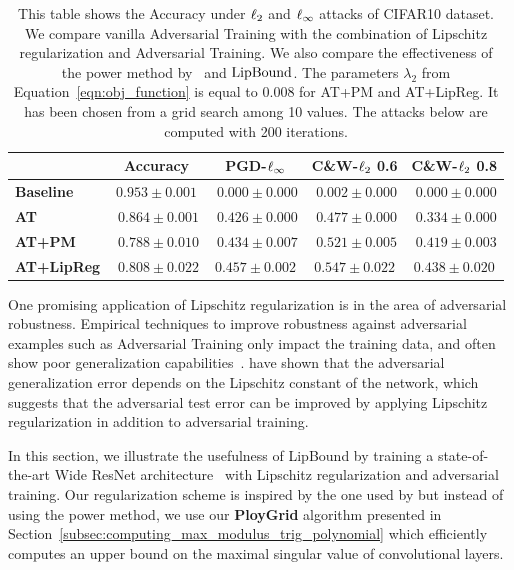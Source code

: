 \begin{table}[t]
  \centering
  \caption{This table shows the Accuracy under $\ell_2$ and $\ell_\infty$ attacks of CIFAR10 dataset. We compare vanilla Adversarial Training with the combination of Lipschitz regularization and Adversarial Training. We also compare the effectiveness of the power method by~\cite{farnia2018generalizable} and $\operatorname{LipBound}$. The parameters $\lambda_2$ from Equation~\ref{eqn:obj_function} is equal to $0.008$ for AT+PM and AT+LipReg. It has been chosen from a grid search among 10 values. The attacks below are computed with 200 iterations. }
    \begin{tabular}{lcccc}
    \toprule
      & \textbf{Accuracy} & \textbf{PGD-$\ell_\infty$} & \textbf{C\&W-$\ell_2$ 0.6} & \textbf{C\&W-$\ell_2$ 0.8} \\
    \midrule
    \textbf{Baseline} & $\mathbf{0.953}\pm0.001$ & $\phantom{.}0.000\pm0.000$ & $\phantom{.}0.002\pm0.000$ & $\phantom{.}0.000\pm0.000$ \\
    \textbf{AT} & $\phantom{.}0.864\pm0.001$ & $\phantom{.}0.426\pm0.000$ & $\phantom{.}0.477\pm0.000$ & $\phantom{.}0.334\pm0.000$ \\
    \textbf{AT+PM} & $\phantom{.}0.788\pm0.010$ & $\phantom{.}0.434\pm0.007$ & $\phantom{.}0.521\pm0.005$	 & $\phantom{.}0.419\pm0.003$ \\
    \textbf{AT+LipReg} & $\phantom{.}0.808\pm0.022$ & $\mathbf{0.457}\pm0.002$ & $\mathbf{0.547}\pm0.022$ & $\mathbf{0.438}\pm0.020$ \\
    \bottomrule
    \end{tabular}%
  \label{tab:table_cifar10_robustness}%
\end{table}%

One promising application of Lipschitz regularization is in the area of adversarial robustness.
Empirical techniques to improve robustness against adversarial examples such as Adversarial Training only impact the training data,  and often show poor generalization capabilities~\cite{schmidt2018adversarially}. 
\cite{farnia2018generalizable} have shown that the adversarial generalization error depends on the Lipschitz constant of the network, which suggests that the adversarial test error can be improved by applying Lipschitz regularization in addition to adversarial training. 

In this section, we illustrate the usefulness of LipBound by training a state-of-the-art Wide ResNet architecture~\cite{zagoruyko2016wide} with Lipschitz regularization and adversarial training.
Our regularization scheme is inspired by the one used by \cite{yoshida2017spectral} but instead of using the power method, we use our \textbf{PloyGrid} algorithm presented in Section~\ref{subsec:computing_max_modulus_trig_polynomial} which efficiently computes an upper bound on the maximal singular value of convolutional layers. 

